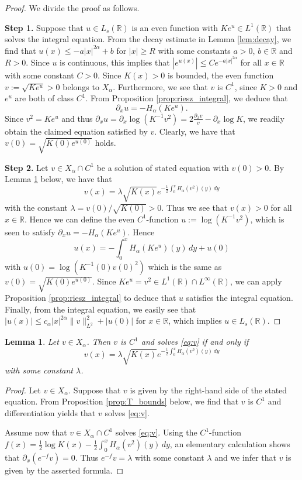 \documentclass[reqno,10pt,a4paper]{amsart}
\newtheorem{lem}{Lemma}[section]
\theoremstyle{definition}
\theoremstyle{definition}
\theoremstyle{remark}
\theoremstyle{remark}
\numberwithin{equation}{section}
\newcommand{\R}{\mathbb{R}}
\newcommand{\pt}{\partial}
\begin{document}
\begin{proof} We divide the proof as follows.

\medskip
\textbf{Step 1.} Suppose that $u \in L_s(\R)$ is an even function with $K e^u \in L^1(\R)$ that solves the integral equation. From the decay estimate in Lemma \ref{lem:decay}, we find that $u(x) \leq -a |x|^{2 \alpha} + b$ for $|x| \geq R$ with some constants $a > 0$, $b \in \R$ and $R > 0$. Since $u$ is continuous, this implies that $|e^{u(x)}| \leq C e^{-a |x|^{2 \alpha}}$ for all $x \in \R$ with some constant $C>0$. Since $K(x) > 0$ is bounded,  the even function $v := \sqrt{K e^{u}}>0$ belongs to $X_\alpha$. Furthermore, we see that $v$ is $C^1$, since $K > 0$  and $e^{u}$ are both of class $C^1$. From Proposition \ref{prop:riesz_integral}, we deduce that
$$
\pt_x u = -H_\alpha(K e^u) .
$$
Since $v^2 = K e^u$ and thus $\pt_x u = \pt_x \log(K^{-1} v^2) = 2 \frac{\pt_x v}{v} - \pt_x \log K$, we readily obtain the claimed equation satisfied by $v$. Clearly, we have that $v(0) = \sqrt{K(0) e^{u(0)}}$ holds.

\medskip
\textbf{Step 2.} Let $v \in X_\alpha \cap C^1$ be a solution of stated equation with $v(0) > 0$. By Lemma \ref{lem:ode} below, we have that
$$
v(x) = \lambda \sqrt{K(x)} e^{-\frac{1}{2} \int_0^x H_\alpha(v^2)(y) \, dy}
$$
with the constant $\lambda = v(0)/\sqrt{K(0)} > 0$. Thus we see that $v(x) > 0$ for all $x \in \R$. Hence we can define the even $C^1$-function $u := \log(K^{-1} v^2)$, which is seen to satisfy $\pt_x u = -H_\alpha(K e^u)$. Hence
$$
u(x) = -\int_0^x H_\alpha(K e^u)(y) \, dy + u(0)
$$
with $u(0) = \log(K^{-1}(0) v(0)^2)$ which is the same as $v(0) = \sqrt{K(0) e^{u(0)}}$. Since $K e^u = v^2 \in L^1(\R) \cap L^\infty(\R)$, we can apply Proposition \ref{prop:riesz_integral} to deduce that $u$ satisfies the integral equation. Finally, from the integral equation, we easily see that $|u(x)| \leq c_\alpha |x|^{2 \alpha} \| v \|_{L^2}^2 + |u(0)|$ for $x \in \R$, which  implies  $u \in L_s(\R)$.
\end{proof}

\begin{lem} \label{lem:ode}
Let $v \in X_\alpha$. Then $v$ is $C^1$ and solves \eqref{eq:v} if and only if
$$
v(x) = \lambda \sqrt{K(x)} e^{-\frac{1}{2} \int_0^x H_\alpha(v^2)(y) \, dy} 
$$
with some constant $\lambda$.
\end{lem}

\begin{proof}
Let $v \in X_\alpha$. Suppose that $v$ is given by the right-hand side of the stated equation. From Proposition \ref{prop:T_bounds} below, we find that $v$ is $C^1$ and differentiation yields that $v$ solves \eqref{eq:v}.

Assume now that $v \in X_\alpha \cap C^1$  solves \eqref{eq:v}. Using the $C^1$-function $f(x)= \frac{1}{2} \log K(x)- \frac{1}{2} \int_0^x H_\alpha(v^2)(y) \, dy$, an elementary calculation shows that $\pt_x (e^{-f} v) = 0$. Thus $e^{-f} v = \lambda$ with some constant $\lambda$ and we infer that $v$ is given by the asserted formula.
\end{proof}
\end{document}
